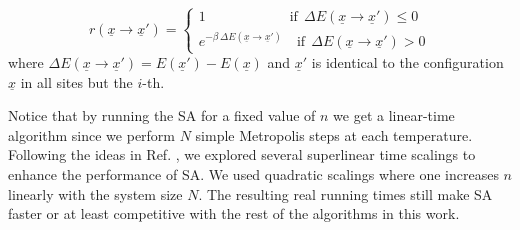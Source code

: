 \documentclass{article}
\begin{document}
\begin{equation}
r(\underline{x} \to \underline{x}') = \begin{cases}
                           1 \quad\qquad\qquad\quad \text{if} \:\: \Delta E(\underline{x} \to \underline{x}') \leq 0 \\
                           e^{-\beta \, \Delta E(\underline{x} \to \underline{x}')}\quad \text{if} \:\: \Delta E(\underline{x} \to \underline{x}') > 0
                          \end{cases}
 \label{eq:Metropolis_rates}
\end{equation}
where $\Delta E(\underline{x} \to \underline{x}') = E(\underline{x}') - E(\underline{x})$ and $\underline{x}'$ is identical to the configuration $\underline{x}$ in all sites but the $i$-th.

Notice that by running the SA for a fixed value of $n$ we get a linear-time algorithm since we perform $N$ simple Metropolis steps at each temperature. Following the ideas in Ref. \cite{angelini2025algorithmic}, we explored several superlinear time scalings to enhance the performance of SA. We used quadratic scalings where one increases $n$ linearly with the system size $N$. The resulting real running times still make SA faster or at least competitive with the rest of the algorithms in this work.
\end{document}
